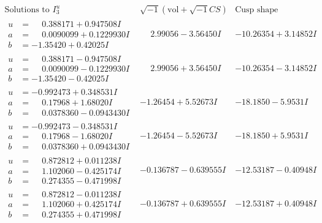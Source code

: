 \documentclass[1p]{elsarticle_modified}
\theoremstyle{definition}
\newcommand{\I}{\sqrt{-1}}
\begin{document}
$$\begin{array}{c|c|c}  
\text{Solutions to }I^u_{3}& \I (\text{vol} + \sqrt{-1}CS) & \text{Cusp shape}\\
 \hline 
\begin{aligned}
u &= \phantom{-}0.388171 + 0.947508 I \\
a &= \phantom{-}0.0090099 + 0.1229930 I \\
b &= -1.35420 + 0.42025 I\end{aligned}
 & \phantom{-}2.99056 - 3.56450 I & -10.26354 + 3.14852 I \\ \hline\begin{aligned}
u &= \phantom{-}0.388171 - 0.947508 I \\
a &= \phantom{-}0.0090099 - 0.1229930 I \\
b &= -1.35420 - 0.42025 I\end{aligned}
 & \phantom{-}2.99056 + 3.56450 I & -10.26354 - 3.14852 I \\ \hline\begin{aligned}
u &= -0.992473 + 0.348531 I \\
a &= \phantom{-}0.17968 + 1.68020 I \\
b &= \phantom{-}0.0378360 - 0.0943430 I\end{aligned}
 & -1.26454 + 5.52673 I & -18.1850 - 5.9531 I \\ \hline\begin{aligned}
u &= -0.992473 - 0.348531 I \\
a &= \phantom{-}0.17968 - 1.68020 I \\
b &= \phantom{-}0.0378360 + 0.0943430 I\end{aligned}
 & -1.26454 - 5.52673 I & -18.1850 + 5.9531 I \\ \hline\begin{aligned}
u &= \phantom{-}0.872812 + 0.011238 I \\
a &= \phantom{-}1.102060 - 0.425174 I \\
b &= \phantom{-}0.274355 - 0.471998 I\end{aligned}
 & -0.136787 - 0.639555 I & -12.53187 - 0.40948 I \\ \hline\begin{aligned}
u &= \phantom{-}0.872812 - 0.011238 I \\
a &= \phantom{-}1.102060 + 0.425174 I \\
b &= \phantom{-}0.274355 + 0.471998 I\end{aligned}
 & -0.136787 + 0.639555 I & -12.53187 + 0.40948 I \\ \hline\begin{aligned}

\end{aligned}
\end{array}$$
\end{document}
